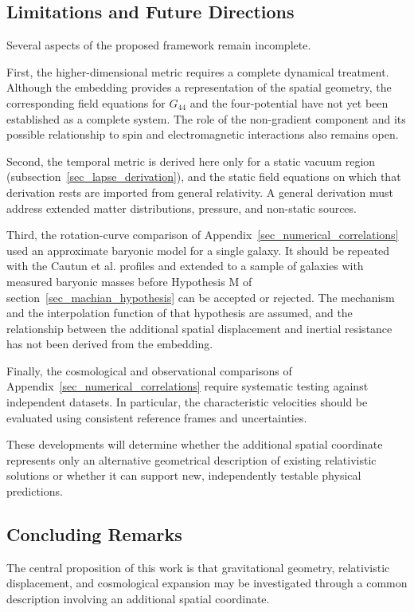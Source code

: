 \documentclass[pdflatex,sn-mathphys-num]{sn-jnl}%
\theoremstyle{thmstyleone}%
\theoremstyle{thmstyletwo}%
\theoremstyle{thmstylethree}%
\begin{document}
\subsection{Limitations and Future Directions}

Several aspects of the proposed framework remain incomplete.

First, the higher-dimensional metric requires a complete dynamical treatment. Although the embedding provides a representation of the spatial geometry, the corresponding field equations for $G_{44}$ and the four-potential have not yet been established as a complete system. The role of the non-gradient component and its possible relationship to spin and electromagnetic interactions also remains open.

Second, the temporal metric is derived here only for a static vacuum region (subsection~\ref{sec_lapse_derivation}), and the static field equations on which that derivation rests are imported from general relativity. A general derivation must address extended matter distributions, pressure, and non-static sources.

Third, the rotation-curve comparison of Appendix~\ref{sec_numerical_correlations} used an approximate baryonic model for a single galaxy. It should be repeated with the Cautun et al. profiles and extended to a sample of galaxies with measured baryonic masses before Hypothesis M of section~\ref{sec_machian_hypothesis} can be accepted or rejected. The mechanism and the interpolation function of that hypothesis are assumed, and the relationship between the additional spatial displacement and inertial resistance has not been derived from the embedding.

Finally, the cosmological and observational comparisons of Appendix~\ref{sec_numerical_correlations} require systematic testing against independent datasets. In particular, the characteristic velocities should be evaluated using consistent reference frames and uncertainties.

These developments will determine whether the additional spatial coordinate represents only an alternative geometrical description of existing relativistic solutions or whether it can support new, independently testable physical predictions.

\subsection{Concluding Remarks}

The central proposition of this work is that gravitational geometry, relativistic displacement, and cosmological expansion may be investigated through a common description involving an additional spatial coordinate.
\end{document}
